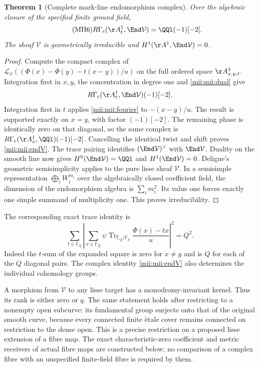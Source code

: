 \documentclass[11pt,a4paper]{article}
\newtheorem{theorem}{Theorem}[section]
\begin{document}
\begin{theorem}[Complete mark-line endomorphism complex]\label{mii:mii:irreducible}
Over the algebraic closure of the specified finite ground field,
\begin{equation}\tag{MII6}\label{mii:mii:endV}
 R\Gamma_c(\AA_t^1,\End\mathcal V)=\QQl(-1)[-2].
\end{equation}
The sheaf $\mathcal V$ is geometrically irreducible and
$H^1(\AA^1,\End\mathcal V)=0$.
\end{theorem}
\begin{proof}
Compute the compact complex of
$\mathcal L_\psi((\Phi(x)-\Phi(y)-t(x-y))/u)$ on the full ordered
space $\AA^3_{x,y,t}$. Integration first in $x,y$, the concentration in
degree one and \eqref{mii:mii:dual} give
\[
 R\Gamma_c(\AA_t^1,\End\mathcal V)(-1)[-2].
\]
Integration first in $t$ applies \eqref{mii:mii:fourier} to
$-(x-y)/u$. The result is supported exactly on $x=y$, with factor
$(-1)[-2]$. The remaining phase is identically zero on that diagonal, so
the same complex is
$R\Gamma_c(\AA_x^1,\QQl)(-1)[-2]$. Cancelling the identical twist and
shift proves \eqref{mii:mii:endV}. The trace pairing identifies
$(\End\mathcal V)^\vee$ with $\End\mathcal V$. Duality on the smooth
line now gives $H^0(\End\mathcal V)=\QQl$ and $H^1(\End\mathcal V)=0$.
Deligne's geometric semisimplicity applies to the pure lisse sheaf
$\mathcal V$. In a semisimple representation $\bigoplus_i W_i^{m_i}$
over the algebraically closed coefficient field, the dimension of the
endomorphism algebra is $\sum_i m_i^2$. Its value one forces exactly one
simple summand of multiplicity one. This proves irreducibility.
\end{proof}

The corresponding exact trace identity is
\begin{equation}\tag{MII7}\label{mii:mii:moment2}
 \sum_{t\in\mathbb F_Q}
 \left|\sum_{x\in\mathbb F_Q}
 \psi\operatorname{Tr}_{\mathbb F_Q/\mathbb F_p}
             \frac{\Phi(x)-tx}{u}\right|^2=Q^2.
\end{equation}
Indeed the $t$-sum of the expanded square is zero for $x\ne y$ and is
$Q$ for each of the $Q$ diagonal pairs. The complex identity
\eqref{mii:mii:endV} also determines the individual cohomology groups.

A morphism from $\mathcal V$ to any lisse target has a
monodromy-invariant kernel. Thus its rank is either zero or $q$. The
same statement holds after restricting to a nonempty open subcurve: its
fundamental group surjects onto that of the original smooth curve, because
every connected finite \`etale cover remains connected on restriction to
the dense open. This is a precise restriction on a proposed lisse
extension of a fibre map. The exact characteristic-zero coefficient
and metric receivers of actual fibre maps are constructed below; no
comparison of a complex fibre with an unspecified finite-field fibre
is required by them.
\end{document}
